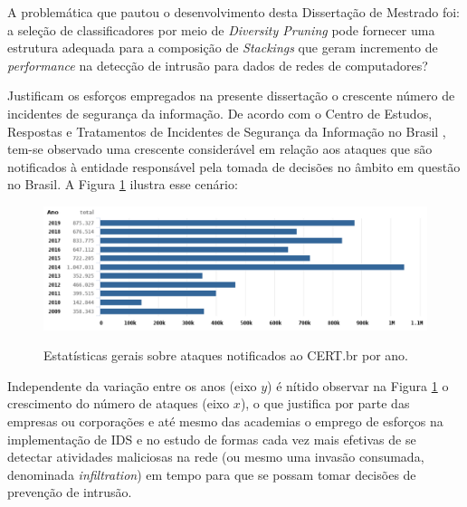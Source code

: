 A problemática que pautou o desenvolvimento desta Dissertação de Mestrado foi: a seleção de classificadores por meio de \textit{Diversity Pruning} pode fornecer uma estrutura adequada para a composição de \textit{Stackings} que geram incremento de \textit{performance} na detecção de intrusão para dados de redes de computadores?

Justificam os esforços empregados na presente dissertação o crescente número de incidentes de segurança da informação. De acordo com o Centro de Estudos, Respostas e Tratamentos de Incidentes de Segurança da Informação no Brasil  \cite{certbr:online}, tem-se observado uma crescente considerável em relação aos ataques que são notificados à entidade responsável pela tomada de decisões no âmbito em questão no Brasil. A Figura \ref{fig:cert} ilustra esse cenário:

\begin{figure}[H]
\centering
\caption{Estatísticas gerais sobre ataques notificados ao CERT.br por ano.}
\includegraphics[width=16.3cm,height=\textwidth,keepaspectratio]{figs/incidentes.png}
\newline{}\label{fig:cert}
\end{figure}

Independente da variação entre os anos (eixo $y$) é nítido observar na Figura \ref{fig:cert} o crescimento do número de ataques (eixo $x$), o que justifica por parte das empresas ou corporações e até mesmo das academias o emprego de esforços na implementação de IDS e no estudo de formas cada vez mais efetivas de se detectar atividades maliciosas na rede (ou mesmo uma invasão consumada, denominada \textit{infiltration}) em tempo para que se possam tomar decisões de prevenção de intrusão.


